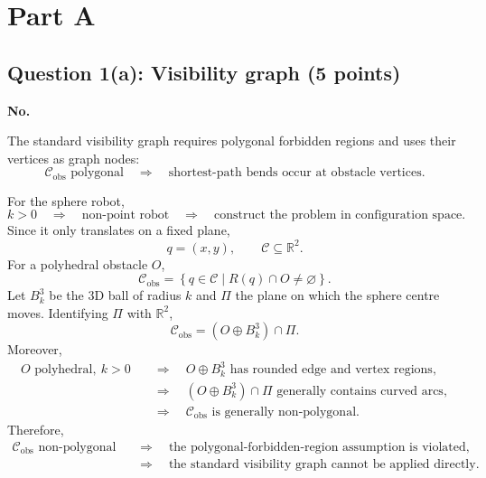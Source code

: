 \documentclass[11pt,a4paper]{article}
\begin{document}
\section*{Part A}

\subsection*{Question 1(a): Visibility graph (5 points)}

\noindent\textbf{No.}

\noindent
The standard visibility graph requires polygonal forbidden regions and uses
their vertices as graph nodes:
\[
  \mathcal{C}_{\mathrm{obs}}\text{ polygonal}
  \quad\Longrightarrow\quad
  \text{shortest-path bends occur at obstacle vertices}.
\]

\noindent
For the sphere robot,
\[
  k>0
  \quad\Longrightarrow\quad
  \text{non-point robot}
  \quad\Longrightarrow\quad
  \text{construct the problem in configuration space}.
\]
\noindent
Since it only translates on a fixed plane,
\[
  q=(x,y),
  \qquad
  \mathcal{C}\subseteq\mathbb{R}^2.
\]
\noindent
For a polyhedral obstacle $O$,
\[
  \mathcal{C}_{\mathrm{obs}}
  =
  \left\{q\in\mathcal{C}\mid R(q)\cap O\neq\varnothing\right\}.
\]
\noindent
Let $B_k^3$ be the 3D ball of radius $k$ and $\Pi$ the plane on which the
sphere centre moves. Identifying $\Pi$ with $\mathbb{R}^2$,
\[
  \mathcal{C}_{\mathrm{obs}}
  =\left(O\oplus B_k^3\right)\cap\Pi.
\]
\noindent
Moreover,
\[
  \begin{aligned}
    O\text{ polyhedral},\ k>0
    &\quad\Longrightarrow\quad
    O\oplus B_k^3\text{ has rounded edge and vertex regions},\\
    &\quad\Longrightarrow\quad
    \left(O\oplus B_k^3\right)\cap\Pi
    \text{ generally contains curved arcs},\\
    &\quad\Longrightarrow\quad
    \mathcal{C}_{\mathrm{obs}}\text{ is generally non-polygonal}.
  \end{aligned}
\]
\noindent
Therefore,
\[
  \begin{aligned}
    \mathcal{C}_{\mathrm{obs}}\text{ non-polygonal}
    &\quad\Longrightarrow\quad
      \text{the polygonal-forbidden-region assumption is violated},\\
    &\quad\Longrightarrow\quad
      \boxed{\text{the standard visibility graph cannot be applied directly}.}
  \end{aligned}
\]
\end{document}
